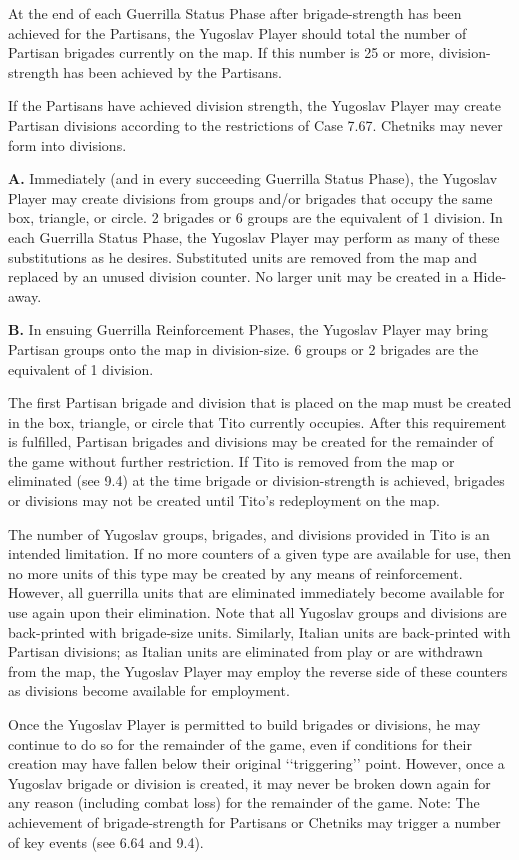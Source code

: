  At the end of each Guerrilla Status Phase after brigade-strength has been achieved for the Partisans, the Yugoslav Player should total the number of Partisan brigades currently on the map. If this number is 25 or more, division-strength has been achieved by the Partisans.

 If the Partisans have achieved division strength, the Yugoslav Player may create Partisan divisions according to the restrictions of Case 7.67. Chetniks may never form into divisions.

\textbf{A.} Immediately (and in every succeeding Guerrilla Status Phase), the Yugoslav Player may create divisions from groups and/or brigades that occupy the same box, triangle, or circle. 2 brigades or 6 groups are the equivalent of 1 division. In each Guerrilla Status Phase, the Yugoslav Player may perform as many of these substitutions as he desires. Substituted units are removed from the map and replaced by an unused division counter. No larger unit may be created in a Hide-away.

\textbf{B.} In ensuing Guerrilla Reinforcement Phases, the Yugoslav Player may bring Partisan groups onto the map in division-size. 6 groups or 2 brigades are the equivalent of 1 division.

 The first Partisan brigade and division that is placed on the map must be created in the box, triangle, or circle that Tito currently occupies. After this requirement is fulfilled, Partisan brigades and divisions may be created for the remainder of the game without further restriction. If Tito is removed from the map or eliminated (see 9.4) at the time brigade or division-strength is achieved, brigades or divisions may not be created until Tito’s redeployment on the map.

 The number of Yugoslav groups, brigades, and divisions provided in Tito is an intended limitation. If no more counters of a given type are available for use, then no more units of this type may be created by any means of reinforcement. However, all guerrilla units that are eliminated immediately become available for use again upon their elimination. Note that all Yugoslav groups and divisions are back-printed with brigade-size units. Similarly, Italian units are back-printed with Partisan divisions; as Italian units are eliminated from play or are withdrawn from the map, the Yugoslav Player may employ the reverse side of these counters as divisions become available for employment.

 Once the Yugoslav Player is permitted to build brigades or divisions,
he may continue to do so for the remainder of the game, even if conditions for
their creation may have fallen below their original ‘‘triggering’’ point.
However, once a Yugoslav brigade or division is created, it may never be broken
down again for any reason (including combat loss) for the remainder of the game.
Note: The achievement of brigade-strength for Partisans or Chetniks may trigger
a number of key events (see 6.64 and 9.4).
